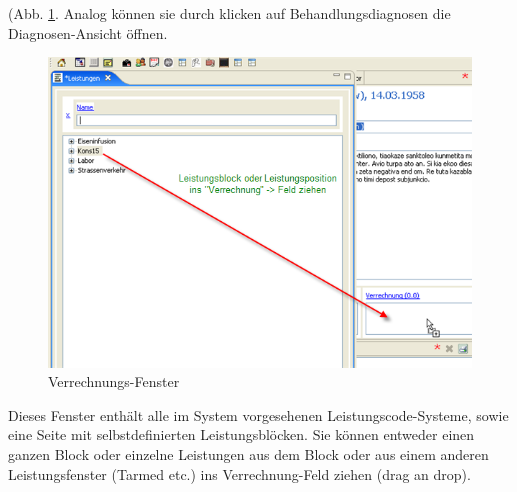 (Abb. \ref{fig:Verrechnung}. Analog können sie durch klicken auf
\glqq Behandlungsdiagnosen\grqq{} die Diagnosen-Ansicht öffnen.\bigskip
\begin{figure}[ht]
	\includegraphics{images/einf7}
	\caption{Verrechnungs-Fenster}
	\label{fig:Verrechnung}
\end{figure}
Dieses Fenster enthält alle im System vorgesehenen Leistungscode-Systeme, sowie eine Seite mit selbstdefinierten Leistungsblöcken.
Sie können entweder einen ganzen Block oder einzelne Leistungen aus dem Block oder aus einem anderen Leistungsfenster (Tarmed etc.)
ins \glqq Verrechnung\grqq{}-Feld ziehen (drag an drop).

